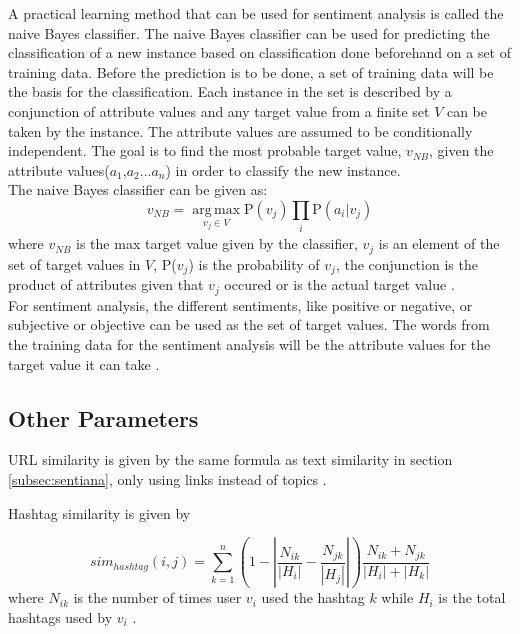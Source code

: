 A practical learning method that can be used for sentiment analysis is called the naive Bayes classifier. The naive Bayes classifier can be used for predicting the classification of a new instance based on classification done beforehand on a set of training data. Before the prediction is to be done, a set of training data will be the basis for the classification. Each instance in the set is described by a conjunction of attribute values and any target value from a finite set $V$ can be taken by the instance. The attribute values are assumed to be conditionally independent. The goal is to find the most probable target value, $v_{NB}$, given the attribute values($a_1$,$a_2$...$a_n$) in order to classify the new instance. \\ The naive Bayes classifier can be given as:
\begin{equation}
v_{NB} = \operatorname*{arg\,max}_{v_j \in V} \text{P}(v_j) \prod_{\substack{i}} \text{P}(a_i|v_j)
\end{equation}
where $v_{NB}$ is the max target value given by the classifier, $v_j$ is an element of the set of target values in $V$, P($v_j$) is the probability of $v_j$, the conjunction is the product of attributes given that $v_j$ occured or is the actual target value \cite{Mitchell:1997}. \\
For sentiment analysis, the different sentiments, like positive or negative, or subjective or objective can be used as the set of target values. The words from the training data for the sentiment analysis will be the attribute values for the target value it can take \cite{Deitrick:2013}.

\subsection{Other Parameters}

URL similarity is given by the same formula as text similarity in section \ref{subsec:sentiana}, only using links instead of topics \cite{Zhang:2012}.

Hashtag similarity is given by 

\begin{equation}
sim_{hashtag}(i,j) = \sum_{k=1}^n (1 - \left|{\frac{N_{ik}}{\left|{H_i}\right|} - \frac{N_{jk}}{\left|{H_j}\right|}}\right|)\frac{N_{ik} + N_{jk}}{\left|{H_i}\right| + \left|{H_k}\right|}
\end{equation}where $N_{ik}$ is the number of times user $v_i$ used the hashtag $k$ while $H_i$ is the total hashtags used by $v_i$ \cite{Zhang:2012}.

